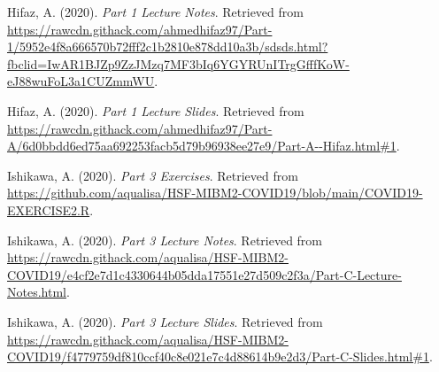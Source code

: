 \documentclass{article}
\begin{document}
\begin{thebibliography}{5}
 Hifaz, A. (2020). \textit{Part 1 Lecture Notes}. Retrieved from \url{https://rawcdn.githack.com/ahmedhifaz97/Part-1/5952e4f8a666570b72fff2c1b2810e878dd10a3b/sdsds.html?fbclid=IwAR1BJZp9ZzJMzq7MF3bIq6YGYRUnITrgGfffKoW-eJ88wuFoL3a1CUZmmWU}.

 Hifaz, A. (2020). \textit{Part 1 Lecture Slides}.  Retrieved from  \url{https://rawcdn.githack.com/ahmedhifaz97/Part-A/6d0bbdd6ed75aa692253facb5d79b96938ee27e9/Part-A--Hifaz.html#1}.

 Ishikawa, A. (2020). \textit{Part 3 Exercises}. Retrieved from \url{https://github.com/aqualisa/HSF-MIBM2-COVID19/blob/main/COVID19-EXERCISE2.R}.

 Ishikawa, A. (2020).  \textit{Part 3 Lecture Notes}. Retrieved from \url{https://rawcdn.githack.com/aqualisa/HSF-MIBM2-COVID19/e4cf2e7d1c4330644b05dda17551e27d509c2f3a/Part-C-Lecture-Notes.html}.

 Ishikawa, A. (2020). \textit{Part 3 Lecture Slides}. Retrieved from \url{https://rawcdn.githack.com/aqualisa/HSF-MIBM2-COVID19/f4779759df810ccf40c8e021e7c4d88614b9e2d3/Part-C-Slides.html#1}.

\end{thebibliography}
\end{document}
